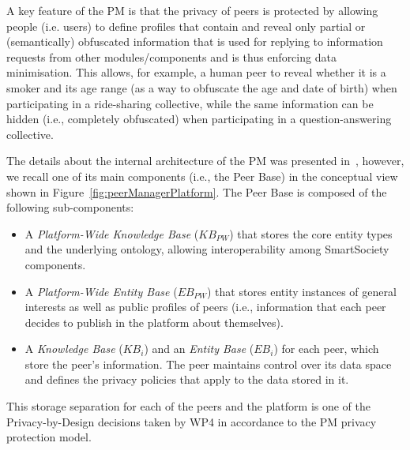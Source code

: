 A key feature of the PM is that the privacy of peers is protected by allowing people (i.e. users) to define profiles that contain and reveal only partial or (semantically) obfuscated information that is used for replying to information requests from other modules/components and is thus enforcing data minimisation. 
This allows, for example, a human peer to reveal whether it is a smoker and its age range (as a way to obfuscate the age and date of birth) when participating in a ride-sharing collective, while the same information can be hidden (i.e., completely obfuscated) when participating in a question-answering collective.

The details about the internal architecture of the PM was presented in~\cite{D4.2,Hartswood:2015fe}, however, we recall one of its main components (i.e., the Peer Base) in the conceptual view shown in Figure~\ref{fig:peerManagerPlatform}. The Peer Base is composed of the following sub-components: 
\begin{itemize}
\item A \emph{Platform-Wide Knowledge Base} (${KB}_{PW}$) that stores the core entity types and the underlying ontology, allowing interoperability among SmartSociety components. 
\item A \emph{Platform-Wide Entity Base} (${EB}_{PW}$) that stores entity instances of general interests as well as public profiles of peers (i.e., information that each peer decides to publish in the platform about themselves).
\item A \emph{Knowledge Base} (${KB}_i$) and an \emph{Entity Base} (${EB}_i$) for each peer, which store the peer’s information. The peer maintains control over its data space and defines the privacy policies that apply to the data stored in it. 
\end{itemize}
This storage separation for each of the peers and the platform is one of the Privacy-by-Design decisions taken by WP4 in accordance to the PM  privacy protection model.
%

